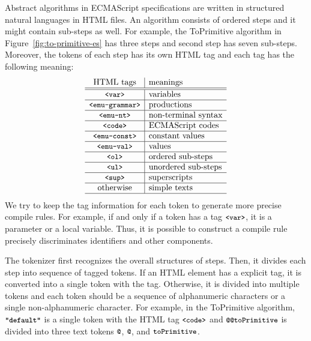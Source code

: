 Abstract algorithms in ECMAScript specifications are written in structured
natural languages in HTML files. An algorithm consists of ordered steps
and it might contain sub-steps as well. For example,
the ToPrimitive algorithm in Figure~\ref{fig:to-primitive-es}
has three steps and second step has seven sub-steps.
Moreover, the tokens of each step has its own HTML tag and each tag
has the following meaning:
\[
  \begin{array}{c|l}
    \text{HTML tags} & \text{meanings}\\\hline\hline
    \texttt{\small<var>} & \text{variables}\\\hline
    \texttt{\small<emu-grammar>} & \text{productions}\\\hline
    \texttt{\small<emu-nt>} & \text{non-terminal syntax}\\\hline
    \texttt{\small<code>} & \text{ECMAScript codes}\\\hline
    \texttt{\small<emu-const>} & \text{constant values}\\\hline
    \texttt{\small<emu-val>} & \text{values}\\\hline
    \texttt{\small<ol>} & \text{ordered sub-steps}\\\hline
    \texttt{\small<ul>} & \text{unordered sub-steps}\\\hline
    \texttt{\small<sup>} & \text{superscripts}\\\hline
    \text{otherwise} & \text{simple texts}\\\hline
  \end{array}
\]
We try to keep the tag information for each token to generate more
precise compile rules. For example, if and only if a token has a tag
\( \texttt{\small<var>} \), it is a parameter or a local variable.
Thus, it is possible to construct a compile rule precisely discriminates
identifiers and other components.

The tokenizer first recognizes the overall structures of steps.
Then, it divides each step into sequence of tagged tokens.
If an HTML element has a explicit tag, it is converted into a single token
with the tag. Otherwise, it is divided into multiple tokens and each token
should be a sequence of alphanumeric characters or a single
non-alphanumeric character. For example, in the ToPrimitive algorithm,
\( \textbf{\texttt{\small"default"}} \) is a single token with the HTML tag \( \texttt{\small<code>} \)
and \( \code{@@toPrimitive} \) is divided into three text tokens
\( \code{@} \), \( \code{@} \), and \( \texttt{\small toPrimitive} \).

